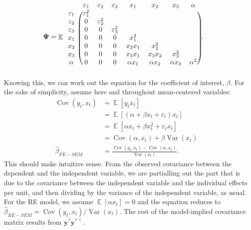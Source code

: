 \documentclass[]{interact}
\theoremstyle{plain}%
\theoremstyle{definition}
\theoremstyle{remark}
\begin{document}
\begin{align}
\bm{\Psi} & = \mathop{\mathrm{\mathbb{E}}}
\begin{blockarray}{cccccccc}
 & \varepsilon_{1} & \varepsilon_{2} & \varepsilon_{3} & x_{1} & x_{2} & x_{3} & \alpha \\
 \begin{block}{c(ccccccc)}
 \varepsilon_{1} & \varepsilon_{1}^{2} &                     &                     &              &              &              & \\
 \varepsilon_{2} & 0                   & \varepsilon_{2}^{2} &                     &              &              &              & \\
 \varepsilon_{3} & 0                   & 0                   & \varepsilon_{3}^{2} &              &              &              & \\
 x_{1}           & 0                   & 0                   & 0                   & x_{1}^{2}    &              &              & \\
 x_{2}           & 0                   & 0                   & 0                   & x_{2}x_{1}   & x_{2}^{2}    &              & \\
 x_{3}           & 0                   & 0                   & 0                   & x_{3}x_{1}   & x_{3}x_{2}   & x_{3}^{2}    & \\
 \alpha          & 0                   & 0                   & 0                   & \alpha x_{1} & \alpha x_{2} & \alpha x_{3} & \alpha^{2} \\
 \end{block}
\end{blockarray}.
\end{align} Knowing this, we can work out the equation for the
coefficient of interest, \(\beta\). For the sake of simplicity, assume
here and throughout mean-centered variables: \begin{align}
\mathop{\mathrm{\mathrm{Cov}}}(y_{t},x_{t}) & = \mathop{\mathrm{\mathbb{E}}}[y_{t}x_{t}] \\
 & = \mathop{\mathrm{\mathbb{E}}}[(\alpha + \beta x_{t} + \varepsilon_{t})x_{t}] \\
 & = \mathop{\mathrm{\mathbb{E}}}[\alpha x_{t} + \beta x_{t}^{2} + \varepsilon_{t}x_{t}] \\
 & = \mathop{\mathrm{\mathrm{Cov}}}(\alpha, x_{t}) + \beta \mathop{\mathrm{\mathrm{Var}}}(x_{t}) \\
\hat{\beta}_{FE-SEM} & = \frac{\mathop{\mathrm{\mathrm{Cov}}}(y_{t},x_{t}) - \mathop{\mathrm{\mathrm{Cov}}}(\alpha, x_{t})}{\mathop{\mathrm{\mathrm{Var}}}(x_{t})}. 
\end{align} This should make intuitive sense. From the observed
covariance between the dependent and the independent variable, we are
partialling out the part that is due to the covariance between the
independent variable and the individual effects per unit, and then
dividing by the variance of the independent variable, as usual. For the
RE model, we assume \(\mathop{\mathrm{\mathbb{E}}}[\alpha x_{t}] = 0\)
and the equation reduces to
\(\hat{\beta}_{RE-SEM} = \mathop{\mathrm{\mathrm{Cov}}}(y_{t},x_{t})/\mathop{\mathrm{\mathrm{Var}}}(x_{t})\).
The rest of the model-implied covariance matrix results from
\(\bm{y}^{*}\bm{y}^{* \intercal}\).
\end{document}
